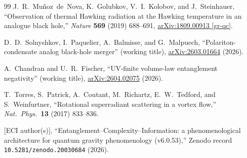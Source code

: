 \documentclass[12pt,a4paper]{article}
\begin{document}
\begin{thebibliography}{99}
J.~R.~Mu\~{n}oz~de~Nova, K.~Golubkov, V.~I.~Kolobov, and J.~Steinhauer,
``Observation of thermal Hawking radiation at the Hawking temperature in
an analogue black hole,''
\textit{Nature} \textbf{569} (2019) 688--691,
\href{https://arxiv.org/abs/1809.00913}{arXiv:1809.00913 [gr-qc]}.

D.~D.~Solnyshkov, I.~Paquelier, A.~Balmisse, and G.~Malpuech,
``Polariton-condensate analog black-hole merger'' (working title),
\href{https://arxiv.org/abs/2603.01664}{arXiv:2603.01664}
(2026).

A.~Chandran and U.~R.~Fischer,
``UV-finite volume-law entanglement negativity'' (working title),
\href{https://arxiv.org/abs/2604.02075}{arXiv:2604.02075}
(2026).

T.~Torres, S.~Patrick, A.~Coutant, M.~Richartz, E.~W.~Tedford, and S.~Weinfurtner,
``Rotational superradiant scattering in a vortex flow,''
\textit{Nat.\ Phys.}\ \textbf{13} (2017) 833--836.

[ECI author(s)],
``Entanglement--Complexity--Information: a phenomenological architecture
for quantum gravity phenomenology (v6.0.53),''
Zenodo record \texttt{10.5281/zenodo.20030684} (2026).

\end{thebibliography}
\end{document}
